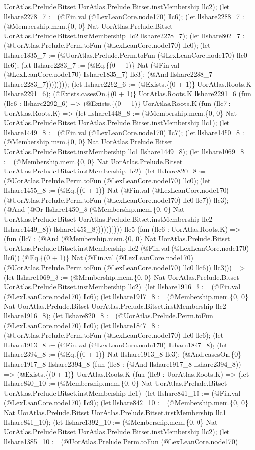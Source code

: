 \documentclass[11pt]{article}
\begin{document}
UorAtlas.Prelude.Bitset UorAtlas.Prelude.Bitset.instMembership llc2); (let llshare2278\_7 := (@Fin.val (@LexLeanCore.node170) llc6); (let llshare2288\_7 := (@Membership.mem.\{0, 0\} Nat UorAtlas.Prelude.Bitset UorAtlas.Prelude.Bitset.instMembership llc2 llshare2278\_7); (let llshare802\_7 := (@UorAtlas.Prelude.Perm.toFun (@LexLeanCore.node170) llc0); (let llshare1835\_7 := (@UorAtlas.Prelude.Perm.toFun (@LexLeanCore.node170) llc0 llc6); (let llshare2283\_7 := (@Eq.\{(0 + 1)\} Nat (@Fin.val (@LexLeanCore.node170) llshare1835\_7) llc3); (@And llshare2288\_7 llshare2283\_7)))))))); (let llshare2292\_6 := (@Exists.\{(0 + 1)\} UorAtlas.Roots.K llshare2291\_6); (@Exists.casesOn.\{(0 + 1)\} UorAtlas.Roots.K llshare2291\_6 (fun (llc6 : llshare2292\_6) => (@Exists.\{(0 + 1)\} UorAtlas.Roots.K (fun (llc7 : UorAtlas.Roots.K) => (let llshare1448\_8 := (@Membership.mem.\{0, 0\} Nat UorAtlas.Prelude.Bitset UorAtlas.Prelude.Bitset.instMembership llc1); (let llshare1449\_8 := (@Fin.val (@LexLeanCore.node170) llc7); (let llshare1450\_8 := (@Membership.mem.\{0, 0\} Nat UorAtlas.Prelude.Bitset UorAtlas.Prelude.Bitset.instMembership llc1 llshare1449\_8); (let llshare1069\_8 := (@Membership.mem.\{0, 0\} Nat UorAtlas.Prelude.Bitset UorAtlas.Prelude.Bitset.instMembership llc2); (let llshare820\_8 := (@UorAtlas.Prelude.Perm.toFun (@LexLeanCore.node170) llc0); (let llshare1455\_8 := (@Eq.\{(0 + 1)\} Nat (@Fin.val (@LexLeanCore.node170) (@UorAtlas.Prelude.Perm.toFun (@LexLeanCore.node170) llc0 llc7)) llc3); (@And (@Or llshare1450\_8 (@Membership.mem.\{0, 0\} Nat UorAtlas.Prelude.Bitset UorAtlas.Prelude.Bitset.instMembership llc2 llshare1449\_8)) llshare1455\_8)))))))))) llc5 (fun (llc6 : UorAtlas.Roots.K) => (fun (llc7 : (@And (@Membership.mem.\{0, 0\} Nat UorAtlas.Prelude.Bitset UorAtlas.Prelude.Bitset.instMembership llc2 (@Fin.val (@LexLeanCore.node170) llc6)) (@Eq.\{(0 + 1)\} Nat (@Fin.val (@LexLeanCore.node170) (@UorAtlas.Prelude.Perm.toFun (@LexLeanCore.node170) llc0 llc6)) llc3))) => (let llshare1069\_8 := (@Membership.mem.\{0, 0\} Nat UorAtlas.Prelude.Bitset UorAtlas.Prelude.Bitset.instMembership llc2); (let llshare1916\_8 := (@Fin.val (@LexLeanCore.node170) llc6); (let llshare1917\_8 := (@Membership.mem.\{0, 0\} Nat UorAtlas.Prelude.Bitset UorAtlas.Prelude.Bitset.instMembership llc2 llshare1916\_8); (let llshare820\_8 := (@UorAtlas.Prelude.Perm.toFun (@LexLeanCore.node170) llc0); (let llshare1847\_8 := (@UorAtlas.Prelude.Perm.toFun (@LexLeanCore.node170) llc0 llc6); (let llshare1913\_8 := (@Fin.val (@LexLeanCore.node170) llshare1847\_8); (let llshare2394\_8 := (@Eq.\{(0 + 1)\} Nat llshare1913\_8 llc3); (@And.casesOn.\{0\} llshare1917\_8 llshare2394\_8 (fun (llc8 : (@And llshare1917\_8 llshare2394\_8)) => (@Exists.\{(0 + 1)\} UorAtlas.Roots.K (fun (llc9 : UorAtlas.Roots.K) => (let llshare840\_10 := (@Membership.mem.\{0, 0\} Nat UorAtlas.Prelude.Bitset UorAtlas.Prelude.Bitset.instMembership llc1); (let llshare841\_10 := (@Fin.val (@LexLeanCore.node170) llc9); (let llshare842\_10 := (@Membership.mem.\{0, 0\} Nat UorAtlas.Prelude.Bitset UorAtlas.Prelude.Bitset.instMembership llc1 llshare841\_10); (let llshare1392\_10 := (@Membership.mem.\{0, 0\} Nat UorAtlas.Prelude.Bitset UorAtlas.Prelude.Bitset.instMembership llc2); (let llshare1385\_10 := (@UorAtlas.Prelude.Perm.toFun (@LexLeanCore.node170) 
\end{document}
